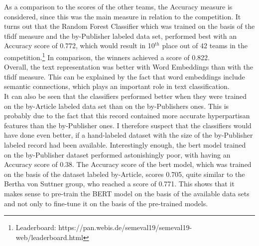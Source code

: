 \documentclass[a4paper, 11pt,titlepage,oneside,openany]{book}
\begin{document}
\indent As a comparison to the scores of the other teams, the Accuracy measure is considered, since this was the main measure in relation to the competition. It turns out that the Random Forest Classifier which was trained on the basis of  the \gls{tfidf} measure and the by-Publisher labeled data set, performed best with an Accuracy score of 0.772, which would result in 10$^{th}$ place out of 42 teams in the competition.\footnote{Leaderboard: https://pan.webis.de/semeval19/semeval19-web/leaderboard.html} In comparison, the winners achieved a score of 0.822.\\
\indent Overall, the text representation was better with Word Embeddings than with the \gls{tfidf} measure. This can be explained by the fact that word embeddings include semantic connections, which plays an important role in text classification. \\
\indent It can also be seen that the classifiers performed better when they were trained on the by-Article labeled data set than on the by-Publishers ones. This is probably due to the fact that this record contained more accurate hyperpartisan features than the by-Publisher ones. I therefore suspect that the classifiers would have done even better, if a hand-labeled dataset with the size of the by-Publisher labeled record had been available. 
\newpage
\indent Interestingly enough, the \gls{bert} model trained on the by-Publisher dataset performed astonishingly poor, with having an Accuracy score of 0.38. The Accuracy score of the \gls{bert} model, which was trained on the basis of the dataset labeled by-Article, scores 0.705, quite similar to the Bertha von Suttner group, who reached a score of 0.771. This shows that it makes sense to pre-train the BERT model on the basis of the available data sets and not only to fine-tune it on the basis of the pre-trained models. 
\end{document}
